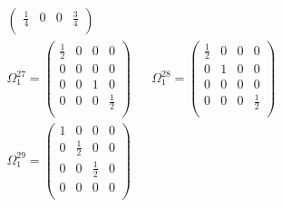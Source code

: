\begin{align*}
\begin{pmatrix}
    \frac{1}{4}  &  0  &  0  &  \frac{3}{4}  \\
    \end{pmatrix}
    \\
    \Omega_{1}^{27} = 
    \begin{pmatrix}
    \frac{1}{2}  &  0  &  0  &  0  \\
    0  &  0  &  0  &  0  \\
    0  &  0  &  1  &  0  \\
    0  &  0  &  0  &  \frac{1}{2}  \\
    \end{pmatrix}
    &&
    \Omega_{1}^{28} = 
    \begin{pmatrix}
    \frac{1}{2}  &  0  &  0  &  0  \\
    0  &  1  &  0  &  0  \\
    0  &  0  &  0  &  0  \\
    0  &  0  &  0  &  \frac{1}{2}  \\
    \end{pmatrix}
    \\
    \Omega_{1}^{29} = 
    \begin{pmatrix}
    1  &  0  &  0  &  0  \\
    0  &  \frac{1}{2}  &  0  &  0  \\
    0  &  0  &  \frac{1}{2}  &  0  \\
    0  &  0  &  0  &  0  \\
    \end{pmatrix}
    &&
\end{align*}
